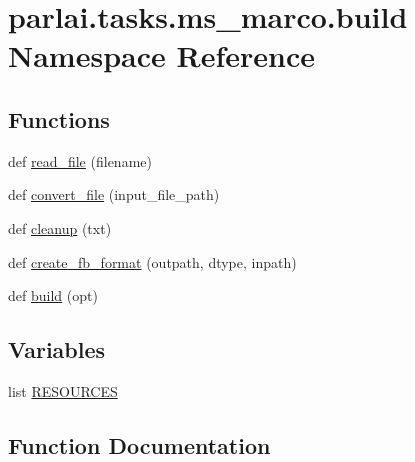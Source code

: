 \hypertarget{namespaceparlai_1_1tasks_1_1ms__marco_1_1build}{}\section{parlai.\+tasks.\+ms\+\_\+marco.\+build Namespace Reference}
\label{namespaceparlai_1_1tasks_1_1ms__marco_1_1build}
\subsection*{Functions}
\begin{DoxyCompactItemize}
\item 
def \hyperlink{namespaceparlai_1_1tasks_1_1ms__marco_1_1build_a8e7fee7824a3a7aa1facadf9979f3f4a}{read\+\_\+file} (filename)
\item 
def \hyperlink{namespaceparlai_1_1tasks_1_1ms__marco_1_1build_ac19db5d0ad4ba8559f6aca64f2fe192b}{convert\+\_\+file} (input\+\_\+file\+\_\+path)
\item 
def \hyperlink{namespaceparlai_1_1tasks_1_1ms__marco_1_1build_a6c94ade2f99fa70bf4103a22a1fbdc42}{cleanup} (txt)
\item 
def \hyperlink{namespaceparlai_1_1tasks_1_1ms__marco_1_1build_ac3cdd4cc2ccd3e9551ddd0349b94d537}{create\+\_\+fb\+\_\+format} (outpath, dtype, inpath)
\item 
def \hyperlink{namespaceparlai_1_1tasks_1_1ms__marco_1_1build_a3516057a3812247cdb1b1c9e8f6cb84d}{build} (opt)
\end{DoxyCompactItemize}
\subsection*{Variables}
\begin{DoxyCompactItemize}
\item 
list \hyperlink{namespaceparlai_1_1tasks_1_1ms__marco_1_1build_a48ba34d46d7f00385ee5b30e91255f9d}{R\+E\+S\+O\+U\+R\+C\+ES}
\end{DoxyCompactItemize}


\subsection{Function Documentation}
\mbox{\label{namespaceparlai_1_1tasks_1_1ms__marco_1_1build_a3516057a3812247cdb1b1c9e8f6cb84d}} 
